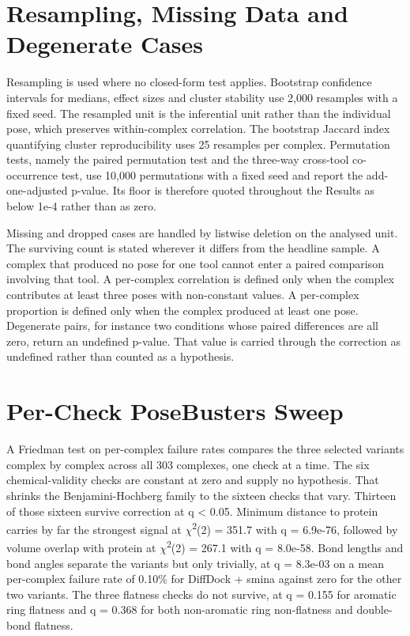 \hypertarget{resampling-and-missing-data}{%
\section{Resampling, Missing Data and Degenerate Cases}\label{resampling-and-missing-data}}

Resampling is used where no closed-form test applies. Bootstrap confidence intervals for medians, effect sizes and cluster stability use 2,000 resamples with a fixed seed. The resampled unit is the inferential unit rather than the individual pose, which preserves within-complex correlation. The bootstrap Jaccard index quantifying cluster reproducibility uses 25 resamples per complex. Permutation tests, namely the paired permutation test and the three-way cross-tool co-occurrence test, use 10,000 permutations with a fixed seed and report the add-one-adjusted p-value. Its floor is therefore quoted throughout the Results as below 1e-4 rather than as zero.

Missing and dropped cases are handled by listwise deletion on the analysed unit. The surviving count is stated wherever it differs from the headline sample. A complex that produced no pose for one tool cannot enter a paired comparison involving that tool. A per-complex correlation is defined only when the complex contributes at least three poses with non-constant values. A per-complex proportion is defined only when the complex produced at least one pose. Degenerate pairs, for instance two conditions whose paired differences are all zero, return an undefined p-value. That value is carried through the correction as undefined rather than counted as a hypothesis.

\hypertarget{per-check-posebusters-sweep}{%
\section{Per-Check PoseBusters Sweep}\label{per-check-posebusters-sweep}}

A Friedman test on per-complex failure rates compares the three selected variants complex by complex across all 303 complexes, one check at a time. The six chemical-validity checks are constant at zero and supply no hypothesis. That shrinks the Benjamini-Hochberg family to the sixteen checks that vary. Thirteen of those sixteen survive correction at q \textless{} 0.05. Minimum distance to protein carries by far the strongest signal at \ensuremath{\chi}\textsuperscript{2}(2) = 351.7 with q = 6.9e-76, followed by volume overlap with protein at \ensuremath{\chi}\textsuperscript{2}(2) = 267.1 with q = 8.0e-58. Bond lengths and bond angles separate the variants but only trivially, at q = 8.3e-03 on a mean per-complex failure rate of 0.10\% for DiffDock + smina against zero for the other two variants. The three flatness checks do not survive, at q = 0.155 for aromatic ring flatness and q = 0.368 for both non-aromatic ring non-flatness and double-bond flatness.

